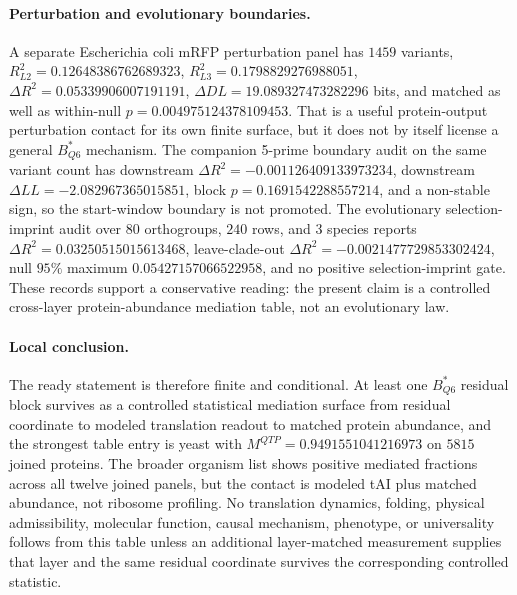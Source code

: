 \paragraph{Perturbation and evolutionary boundaries.}
A separate Escherichia coli mRFP perturbation panel has $1459$ variants, $R^2_{L2}=0.12648386762689323$, $R^2_{L3}=0.1798829276988051$, $\Delta R^2=0.05339906007191191$, $\Delta DL=19.089327473282296$ bits, and matched as well as within-null $p=0.004975124378109453$. That is a useful protein-output perturbation contact for its own finite surface, but it does not by itself license a general $B^*_{Q6}$ mechanism. The companion 5-prime boundary audit on the same variant count has downstream $\Delta R^2=-0.001126409133973234$, downstream $\Delta LL=-2.082967365015851$, block $p=0.1691542288557214$, and a non-stable sign, so the start-window boundary is not promoted. The evolutionary selection-imprint audit over $80$ orthogroups, $240$ rows, and $3$ species reports $\Delta R^2=0.03250515015613468$, leave-clade-out $\Delta R^2=-0.0021477729853302424$, null $95\%$ maximum $0.05427157066522958$, and no positive selection-imprint gate. These records support a conservative reading: the present claim is a controlled cross-layer protein-abundance mediation table, not an evolutionary law.

\paragraph{Local conclusion.}
The ready statement is therefore finite and conditional. At least one $B^*_{Q6}$ residual block survives as a controlled statistical mediation surface from residual coordinate to modeled translation readout to matched protein abundance, and the strongest table entry is yeast with $M^{QTP}=0.9491551041216973$ on $5815$ joined proteins. The broader organism list shows positive mediated fractions across all twelve joined panels, but the contact is modeled tAI plus matched abundance, not ribosome profiling. No translation dynamics, folding, physical admissibility, molecular function, causal mechanism, phenotype, or universality follows from this table unless an additional layer-matched measurement supplies that layer and the same residual coordinate survives the corresponding controlled statistic.
